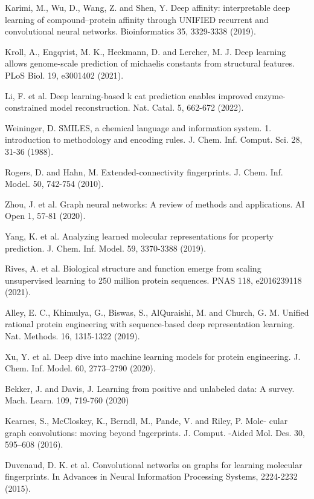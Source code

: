 \documentclass[12pt]{article}
\begin{document}
\begin{thebibliography}{20}
 Karimi, M., Wu, D., Wang, Z. and Shen, Y. Deep affinity: interpretable deep learning of compound–protein affinity through UNIFIED recurrent and convolutional neural networks. Bioinformatics 35, 3329-3338 (2019).

 Kroll, A., Engqvist, M. K., Heckmann, D. and Lercher, M. J. Deep learning allows genome-scale prediction of michaelis constants from structural features. PLoS Biol. 19, e3001402 (2021).

 Li, F. et al. Deep learning-based k cat prediction enables improved enzyme-constrained model reconstruction. Nat. Catal. 5, 662-672 (2022).

 Weininger, D. SMILES, a chemical language and information system. 1. introduction to methodology and encoding rules. J. Chem. Inf. Comput. Sci. 28, 31-36 (1988).

 Rogers, D. and Hahn, M. Extended-connectivity fingerprints. J. Chem. Inf. Model. 50, 742-754 (2010).

 Zhou, J. et al. Graph neural networks: A review of methods and applications. AI Open 1, 57-81 (2020).

 Yang, K. et al. Analyzing learned molecular representations for property prediction. J. Chem. Inf. Model. 59, 3370-3388 (2019).


 Rives, A. et al. Biological structure and function emerge from scaling unsupervised learning to 250 million protein sequences. PNAS 118, e2016239118 (2021).

 Alley, E. C., Khimulya, G., Biswas, S., AlQuraishi, M. and Church, G. M. Unified rational protein engineering with sequence-based deep representation learning. Nat. Methods. 16, 1315-1322 (2019).

 Xu, Y. et al. Deep dive into machine learning models for protein engineering. J. Chem. Inf. Model. 60, 2773–2790 (2020).

 Bekker, J. and Davis, J. Learning from positive and unlabeled data: A survey. Mach. Learn. 109, 719-760 (2020)


 Kearnes, S., McCloskey, K., Berndl, M., Pande, V. and  Riley, P. Mole- cular graph convolutions: moving beyond !ngerprints. J. Comput. -Aided Mol. Des. 30, 595–608 (2016).

 Duvenaud, D. K. et al. Convolutional networks on graphs for learning molecular fingerprints. In Advances in Neural Information Processing Systems, 2224-2232 (2015).


\end{thebibliography}
\end{document}
